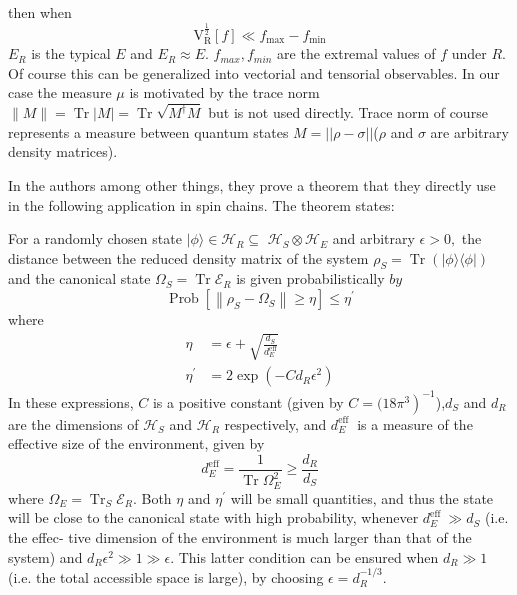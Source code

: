 \documentclass[a4paper,12pt]{article}
\begin{document}
then when 
\begin{equation}\mathrm{V}_{\mathrm{R}}^{\frac{1}{2}}[f] \ll f_{\max }-f_{\min }
\end{equation}
$E_R$ is the typical $E$ and $E_R \approx E$. $f_{max}, f_{min}$ are the extremal values of $f$ under $R$. Of course this can be generalized into vectorial and tensorial observables. In our case the measure $\mu$ is motivated by the trace norm $\|M\|=\operatorname{Tr}|M|=\operatorname{Tr} \sqrt{M^{\dagger} M}$ but is not used directly. Trace norm of course represents a measure between quantum states $M=||\rho-\sigma||$($\rho$ and $\sigma$ are arbitrary density matrices).\par
In \cite{popescu2006entanglement} the authors among other things, they prove a theorem that they directly use in the following application in spin chains. The theorem states: 
\begin{theorem}
\label{theorem}
For a randomly chosen state $|\phi\rangle \in \mathcal{H}_{R} \subseteq$ $\mathcal{H}_{S} \otimes \mathcal{H}_{E}$ and arbitrary $\epsilon>0,$ the distance between the reduced density matrix of the system $\rho_{S}=\operatorname{Tr}(|\phi\rangle\langle\phi|)$ and
the canonical state $\Omega_{S}=\operatorname{Tr} \mathcal{E}_{R}$ is given probabilistically
$b y$
\[
\operatorname{Prob}\left[\left\|\rho_{S}-\Omega_{S}\right\| \geq \eta\right] \leq \eta^{\prime}
\]
where
\[
\begin{aligned}
\eta &=\epsilon+\sqrt{\frac{d_{S}}{d_{E}^{\mathrm{eff}}}} \\
\eta^{\prime} &=2 \exp \left(-C d_{R} \epsilon^{2}\right)
\end{aligned}
\]
In these expressions, $C$ is a positive constant (given by $\left.C=(18 \pi^{3}\right)^{-1}$),$d_{S}$ and $d_{R}$ are the dimensions of $\mathcal{H}_{S}$ and $\mathcal{H}_{R}$ respectively, and $d_{E}^{\text {eff }}$ is a measure of the effective size of the environment, given by
\[
d_{E}^{\mathrm{eff}}=\frac{1}{\operatorname{Tr} \Omega_{E}^{2}} \geq \frac{d_{R}}{d_{S}}
\]
where $\Omega_{E}=\operatorname{Tr}_{S} \mathcal{E}_{R} .$ Both $\eta$ and $\eta^{\prime}$ will be small quantities, and thus the state will be close to the canonical state
with high probability, whenever $d_{E}^{\text {eff }} \gg d_{S}$ (i.e. the effec-
tive dimension of the environment is much larger than that of the system) and $d_{R} \epsilon^{2} \gg 1 \gg \epsilon .$ This latter condition can be ensured when $d_{R} \gg 1$ (i.e. the total accessible
space is large), by choosing $\epsilon=d_{R}^{-1 / 3}$.
\end{theorem}
\end{document}
